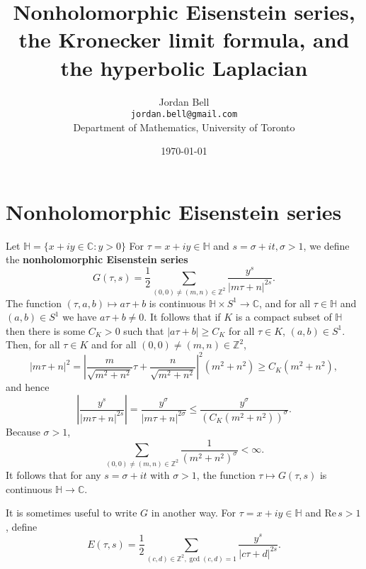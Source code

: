 \documentclass{article}
\def\Re{\ensuremath{\mathrm{Re}}\,}
\theoremstyle{definition}
\theoremstyle{definition}
\begin{document}
\title{Nonholomorphic Eisenstein series, the Kronecker limit formula, and the hyperbolic Laplacian}
\author{Jordan Bell\\ \texttt{jordan.bell@gmail.com}\\Department of Mathematics, University of Toronto}
\date{\today}

\maketitle


\section{Nonholomorphic Eisenstein series}
Let $\mathbb{H} = \{x+iy \in \mathbb{C}: y>0\}$
For $\tau=x+iy \in \mathbb{H}$ and $s=\sigma+it, \sigma>1$, we define the \textbf{nonholomorphic Eisenstein series}
\[
G(\tau,s) = \frac{1}{2} \sum_{(0,0) \neq (m,n) \in \mathbb{Z}^2} \frac{y^s}{|m\tau+n|^{2s}}.
\]
The function $(\tau,a,b) \mapsto a\tau+b$ is continuous $\mathbb{H} \times
S^1 \to \mathbb{C}$, and for all $\tau \in\mathbb{H}$ and $(a,b) \in S^1$ we have $a\tau+b \neq 0$. 
It follows that if $K$ is a compact subset of $\mathbb{H}$ then there is some $C_K>0$ such that
$|a\tau+b| \geq C_K$ for all $\tau \in K$, $(a,b) \in S^1$. Then, for all $\tau \in K$ and for all
$(0,0) \neq (m,n) \in \mathbb{Z}^2$,
\[
|m\tau+n|^2=\left| \frac{m}{\sqrt{m^2+n^2}}\tau+\frac{n}{\sqrt{m^2+n^2}}\right|^2 (m^2+n^2) 
\geq C_K (m^2+n^2),
\]
and hence
\[
\left|  \frac{y^s}{|m\tau+n|^{2s}} \right|=\frac{y^\sigma}{|m\tau+n|^{2\sigma}}
\leq \frac{y^\sigma}{(C_K(m^2+n^2))^{\sigma}}.
\]
Because $\sigma>1$,
\[
\sum_{(0,0) \neq (m,n) \in \mathbb{Z}^2} \frac{1}{(m^2+n^2)^\sigma}<\infty.
\]
It follows that for any $s=\sigma+it$ with $\sigma>1$, the function
$\tau \mapsto G(\tau,s)$ is continuous $\mathbb{H} \to \mathbb{C}$. 

It is sometimes useful to write $G$ in another way. For $\tau=x+iy \in \mathbb{H}$ and $\Re s>1$, define
\[
E(\tau,s) = \frac{1}{2} \sum_{(c,d) \in \mathbb{Z}^2, \gcd(c,d)=1} \frac{y^s}{|c\tau+d|^{2s}}.
\]
\end{document}
